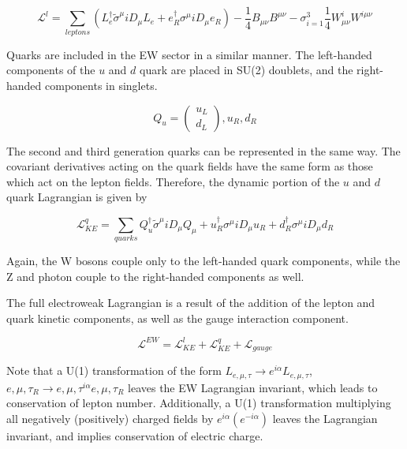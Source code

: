 \begin{equation}
\mathcal{L}^{l} = \sum_{leptons}(L_{e}^{\dagger}\tilde{\sigma}^{\mu}iD_{\mu}L_{e}+e_{R}^{\dagger}\sigma^{\mu}iD_{\mu}e_{R}) - \frac{1}{4}B_{\mu\nu}B^{\mu\nu}- \sigma_{i=1}^{3}\frac{1}{4}W_{\mu\nu}^{i}W^{i\mu\nu}
\end{equation}

Quarks are included in the EW sector in a similar manner. The left-handed components of the $u$ and $d$ quark are placed in SU(2) doublets, and the right-handed components in singlets.

\begin{equation}
Q_{u} = \begin{pmatrix}
	u_{L} \\
	d_{L}
\end{pmatrix}, u_{R}, d_{R}
\end{equation}

The second and third generation quarks can be represented in the same way. The covariant derivatives acting on the quark fields have the same form as those which act on the lepton fields. Therefore, the dynamic portion of the $u$ and $d$ quark Lagrangian is given by

\begin{equation}
\label{Lquark}
\mathcal{L}^{q}_{KE} = \sum_{quarks}Q_{u}^{\dagger}\tilde{\sigma}^{\mu}iD_{\mu}Q_{\mu}+u_{R}^{\dagger}\sigma^{\mu}iD_{\mu}u_{R}+d^{\dagger}_{R}\sigma^{\mu}iD_{\mu}d_{R}
\end{equation}

Again, the W bosons couple only to the left-handed quark components, while the Z and photon couple to the right-handed components as well.

The full electroweak Lagrangian is a result of the addition of the lepton and quark kinetic components, as well as the gauge interaction component.

\begin{equation}
\mathcal{L}^{EW} = \mathcal{L}^{l}_{KE} + \mathcal{L}_{KE}^{q} + \mathcal{L}_{gauge}
\end{equation}

Note that a U(1) transformation of the form $L_{e,\mu,\tau}\rightarrow e^{i\alpha}L_{e,\mu,\tau}$, $e,\mu,\tau_{R}\rightarrow e,\mu,\tau^{i\alpha}e,\mu,\tau_{R}$ leaves the EW Lagrangian invariant, which leads to conservation of lepton number. Additionally, a U(1) transformation multiplying all negatively (positively) charged fields by $e^{i\alpha}(e^{-i\alpha})$ leaves the Lagrangian invariant, and implies conservation of electric charge.

